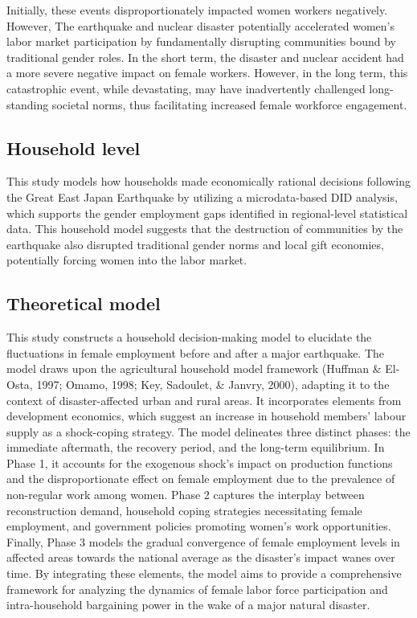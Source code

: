 \documentclass[12pt,halfline,a4paper]{ouparticle}
\begin{document}
Initially, these events disproportionately impacted women workers negatively. However, The earthquake and nuclear disaster potentially accelerated women's labor market participation by fundamentally disrupting communities bound by traditional gender roles. In the short term, the disaster and nuclear accident had a more severe negative impact on female workers. However, in the long term, this catastrophic event, while devastating, may have inadvertently challenged long-standing societal norms, thus facilitating increased female workforce engagement.

\subsection{Household level}
\label{sec5.1}

This study models how households made economically rational decisions following the Great East Japan Earthquake by utilizing a microdata-based DID analysis, which supports the gender employment gaps identified in regional-level statistical data. This household model suggests that the destruction of communities by the earthquake also disrupted traditional gender norms and local gift economies, potentially forcing women into the labor market.


\subsection{Theoretical model}
\label{sec5.1}

This study constructs a household decision-making model to elucidate the fluctuations in female employment before and after a major earthquake. The model draws upon the agricultural household model framework (Huffman \& El-Osta, 1997; Omamo, 1998; Key, Sadoulet, \& Janvry, 2000), adapting it to the context of disaster-affected urban and rural areas. It incorporates elements from development economics, which suggest an increase in household members' labour supply as a shock-coping strategy.
The model delineates three distinct phases: the immediate aftermath, the recovery period, and the long-term equilibrium. In Phase 1, it accounts for the exogenous shock's impact on production functions and the disproportionate effect on female employment due to the prevalence of non-regular work among women. Phase 2 captures the interplay between reconstruction demand, household coping strategies necessitating female employment, and government policies promoting women's work opportunities. Finally, Phase 3 models the gradual convergence of female employment levels in affected areas towards the national average as the disaster's impact wanes over time.
By integrating these elements, the model aims to provide a comprehensive framework for analyzing the dynamics of female labor force participation and intra-household bargaining power in the wake of a major natural disaster.



\nocite{*}

\end{document}
